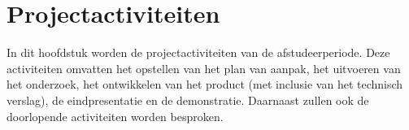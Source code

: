 \chapter{Projectactiviteiten}
In dit hoofdstuk worden de projectactiviteiten van de afstudeerperiode.
Deze activiteiten omvatten het opstellen van het plan van aanpak, het uitvoeren van het onderzoek, het ontwikkelen van het product (met inclusie van het technisch verslag), de eindpresentatie en de demonstratie.
Daarnaast zullen ook de doorlopende activiteiten worden besproken.





